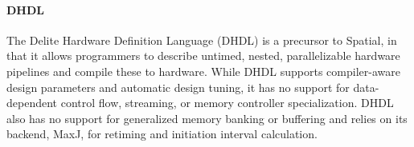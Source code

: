 \paragraph{DHDL}
The Delite Hardware Definition Language (DHDL) \cite{dhdl} is a precursor to Spatial, in that it allows 
programmers to describe untimed, nested, parallelizable hardware pipelines and compile these to hardware.
While DHDL supports compiler-aware design parameters and automatic design tuning, it has no support for data-dependent control flow, streaming, or memory controller specialization. 
DHDL also has no support for generalized memory banking or buffering and relies on its backend, MaxJ, for retiming and initiation interval calculation.



